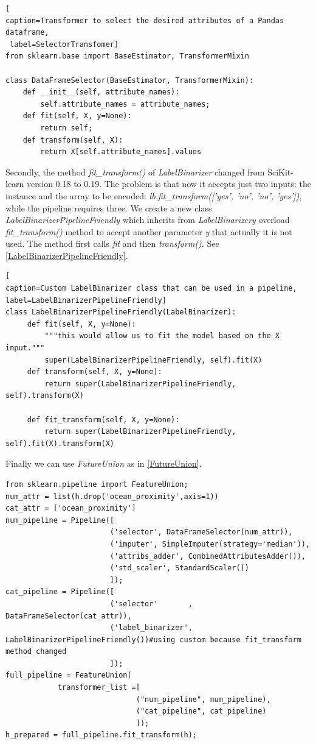 \documentclass[12pt, letterpaper]{article}
\theoremstyle{definition}
\let\ti\textit
\begin{document}
\begin{lstlisting}[
caption=Transformer to select the desired attributes of a Pandas dataframe,
 label=SelectorTransfomer]
from sklearn.base import BaseEstimator, TransformerMixin

class DataFrameSelector(BaseEstimator, TransformerMixin):
    def __init__(self, attribute_names):
        self.attribute_names = attribute_names;
    def fit(self, X, y=None):
        return self;
    def transform(self, X):
        return X[self.attribute_names].values
\end{lstlisting}

Secondly, the method \ti{fit\_transform()} of \ti{LabelBinarizer} changed from SciKit-learn version 0.18 to 0.19. The problem is that now it accepts just two inputs: the instance and the array to be encoded: \ti{lb.fit\_transform(['yes', 'no', 'no', 'yes'])}, while the pipeline requires three.
We create a new class \ti{LabelBinarizerPipelineFriendly} which inherits from \ti{LabelBinarizery} overload \ti{fit\_transform()} method to accept another parameter \ti{y} that actually it is not used. The method first calls \ti{fit} and then \ti{transform()}. See \ref{LabelBinarizerPipelineFriendly}.
\begin{lstlisting}[
caption=Custom LabelBinarizer class that can be used in a pipeline, 
label=LabelBinarizerPipelineFriendly]
class LabelBinarizerPipelineFriendly(LabelBinarizer):
     def fit(self, X, y=None):
         """this would allow us to fit the model based on the X input."""
         super(LabelBinarizerPipelineFriendly, self).fit(X)
     def transform(self, X, y=None):
         return super(LabelBinarizerPipelineFriendly, self).transform(X)

     def fit_transform(self, X, y=None):
         return super(LabelBinarizerPipelineFriendly, self).fit(X).transform(X)
\end{lstlisting}

Finally we can use \ti{FutureUnion} as in \ref{FutureUnion}.
\begin{lstlisting}[caption=Usage of \ti{FutureUnion}, label=FutureUnion]
from sklearn.pipeline import FeatureUnion;
num_attr = list(h.drop('ocean_proximity',axis=1))
cat_attr = ['ocean_proximity']
num_pipeline = Pipeline([
                        ('selector', DataFrameSelector(num_attr)),
                        ('imputer', SimpleImputer(strategy='median')),
                        ('attribs_adder', CombinedAttributesAdder()),
                        ('std_scaler', StandardScaler())
                        ]);
cat_pipeline = Pipeline([
                        ('selector'       , DataFrameSelector(cat_attr)),
                        ('label_binarizer', LabelBinarizerPipelineFriendly())#using custom because fit_transform method changed
                        ]);
full_pipeline = FeatureUnion(
            transformer_list =[
                              ("num_pipeline", num_pipeline), 
                              ("cat_pipeline", cat_pipeline)
                              ]);
h_prepared = full_pipeline.fit_transform(h);
\end{lstlisting} 
\end{document}
